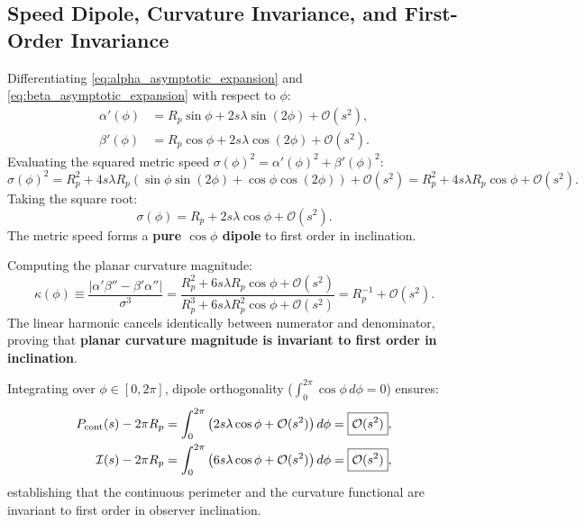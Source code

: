 \subsection{Speed Dipole, Curvature Invariance, and First-Order Invariance}
Differentiating \eqref{eq:alpha_asymptotic_expansion} and \eqref{eq:beta_asymptotic_expansion} with respect to $\phi$:
\begin{align}
    \alpha'(\phi) &= R_p\sin\phi + 2s\lambda\sin(2\phi) + \mathcal{O}(s^2), \label{eq:dalpha_dphi} \\
    \beta'(\phi) &= R_p\cos\phi + 2s\lambda\cos(2\phi) + \mathcal{O}(s^2). \label{eq:dbeta_dphi}
\end{align}
Evaluating the squared metric speed $\sigma(\phi)^2 = \alpha'(\phi)^2 + \beta'(\phi)^2$:
\begin{equation}
    \sigma(\phi)^2 = R_p^2 + 4s\lambda R_p \left(\sin\phi\sin(2\phi) + \cos\phi\cos(2\phi)\right) + \mathcal{O}(s^2) = R_p^2 + 4s\lambda R_p \cos\phi + \mathcal{O}(s^2).
\end{equation}
Taking the square root:
\begin{equation}
    \boxed{\sigma(\phi) = R_p + 2s\lambda\cos\phi + \mathcal{O}(s^2)}.
    \label{eq:speed_dipole}
\end{equation}
The metric speed forms a \textbf{pure $\cos\phi$ dipole} to first order in inclination.

Computing the planar curvature magnitude:
\begin{equation}
    \kappa(\phi) \equiv \frac{|\alpha'\beta'' - \beta'\alpha''|}{\sigma^3} = \frac{R_p^2 + 6s\lambda R_p\cos\phi + \mathcal{O}(s^2)}{R_p^3 + 6s\lambda R_p^2\cos\phi + \mathcal{O}(s^2)} = \boxed{R_p^{-1} + \mathcal{O}(s^2)}.
    \label{eq:curvature_invariance}
\end{equation}
The linear harmonic cancels identically between numerator and denominator, proving that \textbf{planar curvature magnitude is invariant to first order in inclination}.

Integrating over $\phi \in [0, 2\pi]$, dipole orthogonality ($\int_0^{2\pi} \cos\phi\,d\phi = 0$) ensures:
\begin{align}
    P_{\rm cont}(s) - 2\pi R_p &= \int_0^{2\pi} \left(2s\lambda\cos\phi + \mathcal{O}(s^2)\right) d\phi = \boxed{\mathcal{O}(s^2)}, \label{eq:P_cont_invariance} \\
    \mathcal{I}(s) - 2\pi R_p &= \int_0^{2\pi} \left(6s\lambda\cos\phi + \mathcal{O}(s^2)\right) d\phi = \boxed{\mathcal{O}(s^2)}, \label{eq:I_functional_invariance}
\end{align}
establishing that the continuous perimeter and the curvature functional are invariant to first order in observer inclination.

